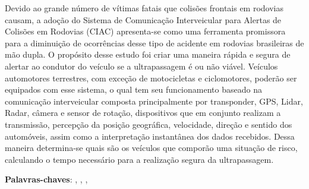 \begin{resumo}
Devido ao grande número de vítimas fatais que colisões frontais em rodovias causam, a adoção do Sistema de Comunicação Interveicular para Alertas de Colisões em Rodovias (CIAC) apresenta-se como uma ferramenta promissora para a diminuição de ocorrências desse tipo de acidente em rodovias brasileiras de mão dupla. O propósito desse estudo foi criar uma maneira rápida e segura de alertar ao condutor do veículo se a ultrapassagem é ou não viável. Veículos automotores terrestres, com exceção de motocicletas e ciclomotores, poderão ser equipados com esse sistema, o qual tem seu funcionamento baseado na comunicação interveicular composta principalmente por transponder, GPS, Lidar, Radar, câmera e sensor de rotação, dispositivos que em conjunto realizam a transmissão, percepção da posição geográfica, velocidade, direção e sentido dos automóveis, assim como a interpretação instantânea dos dados recebidos. Dessa maneira determina-se quais são os veículos que comporão uma situação de risco, calculando o tempo necessário para a realização segura da ultrapassagem. 

 \vspace{\onelineskip}

 \noindent
 \textbf{Palavras-chaves}: \imprimirpalavrachaveum, \imprimirpalavrachavedois, \imprimirpalavrachavetres, \imprimirpalavrachavequatro
\end{resumo}

